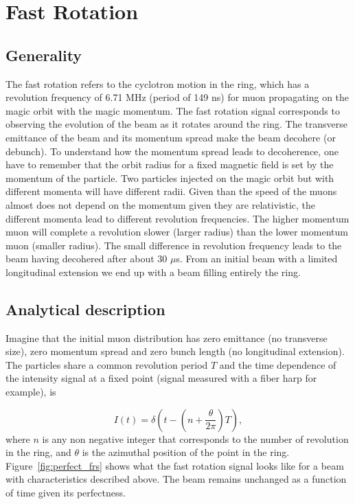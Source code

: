 \section{Fast Rotation}


\subsection{Generality}

The fast rotation refers to the cyclotron motion in the ring, which has a revolution frequency of 6.71 MHz (period of 149 ns) 
for muon propagating on the magic orbit with the magic momentum. 
The fast rotation signal corresponds to observing the evolution of the beam as it rotates around the ring. 
The transverse emittance of the beam and its momentum spread make the beam decohere (or debunch).
To understand how the momentum spread leads to decoherence, one have to remember that the orbit radius for a fixed magnetic
field is set by the momentum of the particle. Two particles injected on the magic orbit but with different momenta will
have different radii. Given than the speed of the muons almost does not depend on the momentum given they are relativistic,
the different momenta lead to different revolution frequencies. The higher momentum muon will complete a revolution
slower (larger radius) than the lower momentum muon (smaller radius). 
The small difference in revolution frequency leads to the beam having decohered after about 30 $\mu$s. 
From an initial beam with a limited longitudinal extension we end up with a beam filling entirely the ring.

\subsection{Analytical description}

Imagine that the initial muon distribution has zero emittance (no transverse size), zero momentum spread and zero bunch length (no longitudinal extension). 
The particles share a common revolution period $T$ and the time dependence of the intensity signal at a fixed point (signal measured with a fiber harp for example), is 

\begin{equation}
I(t)=\delta\left(t-\left(n+\frac{\theta}{2\pi}\right)T\right),
\end{equation} 
where $n$ is any non negative integer that corresponds to the number of revolution in the ring, 
and $\theta$ is the azimuthal position of the point in the ring.
Figure~\ref{fig:perfect_frs} shows what the fast rotation signal looks like for a beam with characteristics described above.
The beam remains unchanged as a function of time given its perfectness.

